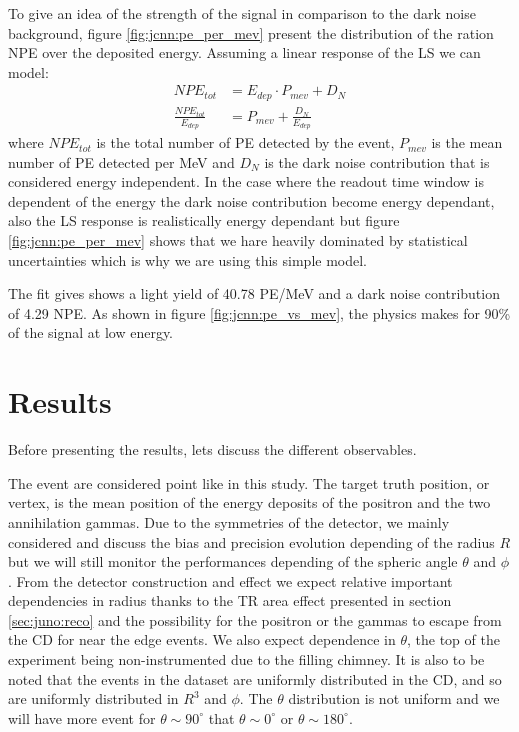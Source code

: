 To give an idea of the strength of the signal in comparison to the dark noise background, figure \ref{fig:jcnn:pe_per_mev} present the distribution of the ration NPE over the deposited energy. Assuming a linear response of the LS we can model:
\begin{align}
  NPE_{tot} &= E_{dep} \cdot P_{mev} + D_{N} \\
  \frac{NPE_{tot}}{E_{dep}} &= P_{mev} + \frac{D_{N}}{E_{dep}} \label{eq:jcnn:pe_per_mev}
\end{align}
where $NPE_{tot}$ is the total number of PE detected by the event, $P_{mev}$ is the mean number of PE detected per MeV and $D_{N}$ is the dark noise contribution that is considered energy independent. In the case where the readout time window is dependent of the energy the dark noise contribution become energy dependant, also the LS response is realistically energy dependant but figure \ref{fig:jcnn:pe_per_mev} shows that we hare heavily dominated by statistical uncertainties which is why we are using this simple model.

The fit gives shows a light yield of 40.78 PE/MeV and a dark noise contribution of 4.29 NPE. As shown in figure \ref{fig:jcnn:pe_vs_mev}, the physics makes for 90\% of the signal at low energy.


\section{Results}

Before presenting the results, lets discuss the different observables.

The event are considered point like in this study. The target truth position, or vertex, is the mean position of the energy deposits of the positron and the two annihilation gammas. Due to the symmetries of the detector, we mainly considered and discuss the bias and precision evolution depending of the radius $R$ but we will still monitor the performances depending of the spheric angle $\theta$ and $\phi$. From the detector construction and effect we expect relative important dependencies in radius thanks to the TR area effect presented in section \ref{sec:juno:reco} and the possibility for the positron or the gammas to escape from the CD for near the edge events. We  also expect dependence in $\theta$, the top of the experiment being non-instrumented due to the filling chimney. It is also to be noted that the events in the dataset are uniformly distributed in the CD, and so are uniformly distributed in $R^3$ and $\phi$. The $\theta$ distribution is not uniform and we will have more event for $\theta \sim 90^{\circ}$ that $\theta \sim 0^{\circ}$ or $\theta \sim 180^{\circ}$.

